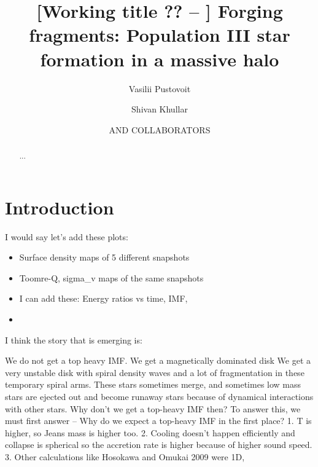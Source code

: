 \documentclass[twocolumn,11pt]{article}
\providecommand{\email}[1]{}
\providecommand{\affiliation}[1]{}
\providecommand{\orcidlink}[1]{}
\begin{document}
\title{[Working title ?? -- ] Forging fragments: Population III star formation in a massive halo}


\author{Vasilii Pustovoit\orcidlink{0000-0000-0000-0000}}
\email{author1@you.com}
\affiliation{Your nice institute / university}
\affiliation{Your second nice institute / university}

\author{Shivan Khullar\orcidlink{0000-0000-0000-0000}}
\email{skhullar@flatironinstitute.org}
\affiliation{Your nice institute / university}
\affiliation{Your second nice institute / university}

\author{AND COLLABORATORS\orcidlink{0000-0000-0000-0000}}
\email{author1@you.com}
\affiliation{Your nice institute / university}
\affiliation{Your second nice institute / university}


\maketitle

\begin{abstract}
... %
\end{abstract}


\section{Introduction}

I would say let's add these plots:

\begin{itemize}
    \item Surface density maps of 5 different snapshots
    \item Toomre-Q, sigma\_v maps of the same snapshots
    \item I can add these: Energy ratios vs time, IMF,
    \item
\end{itemize}

I think the story that is emerging is:

We do not get a top heavy IMF.
We get a magnetically dominated disk
We get a very unstable disk with spiral density waves and a lot of fragmentation in these temporary spiral arms.
These stars sometimes merge, and sometimes low mass stars are ejected out and become runaway stars because of dynamical interactions with other stars.
Why don't we get a top-heavy IMF then? To answer this, we must first answer -- Why do we expect a top-heavy IMF in the first place?
1. T is higher, so Jeans mass is higher too.
2. Cooling doesn't happen efficiently and collapse is spherical so the accretion rate is higher because of higher sound speed.
3. Other calculations like Hosokawa and Omukai 2009 were 1D,
\end{document}
